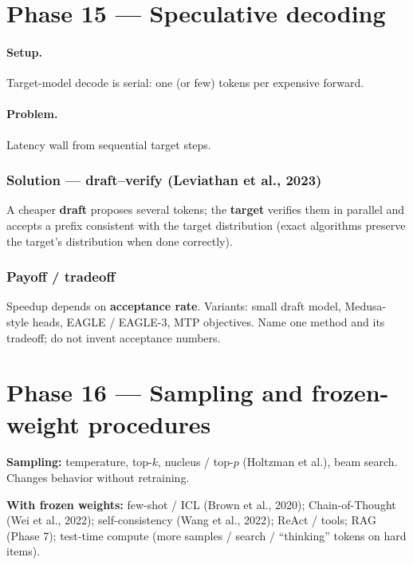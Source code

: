 \documentclass[11pt,a4paper]{article}
\begin{document}
{{\bigskip


\clearpage
\section{Phase 15 --- Speculative decoding}


\paragraph{Setup.}

Target-model decode is serial: one (or few) tokens per expensive forward.


\paragraph{Problem.}

Latency wall from sequential target steps.


\subsubsection{Solution --- draft--verify (Leviathan et al., 2023)}

A cheaper \textbf{draft} proposes several tokens; the \textbf{target} verifies them in parallel and accepts a prefix consistent with the target distribution (exact algorithms preserve the target's distribution when done correctly).


\subsubsection{Payoff / tradeoff}

Speedup depends on \textbf{acceptance rate}. Variants: small draft model, Medusa-style heads, EAGLE / EAGLE-3, MTP objectives. Name one method and its tradeoff; do not invent acceptance numbers.


\bigskip


\clearpage
\section{Phase 16 --- Sampling and frozen-weight procedures}


\textbf{Sampling:} temperature, top-\(k\), nucleus / top-\(p\) (Holtzman et al.), beam search. Changes behavior without retraining.


\textbf{With frozen weights:} few-shot / ICL (Brown et al., 2020); Chain-of-Thought (Wei et al., 2022); self-consistency (Wang et al., 2022); ReAct / tools; RAG (Phase 7); test-time compute (more samples / search / ``thinking'' tokens on hard items).


}}
\end{document}
